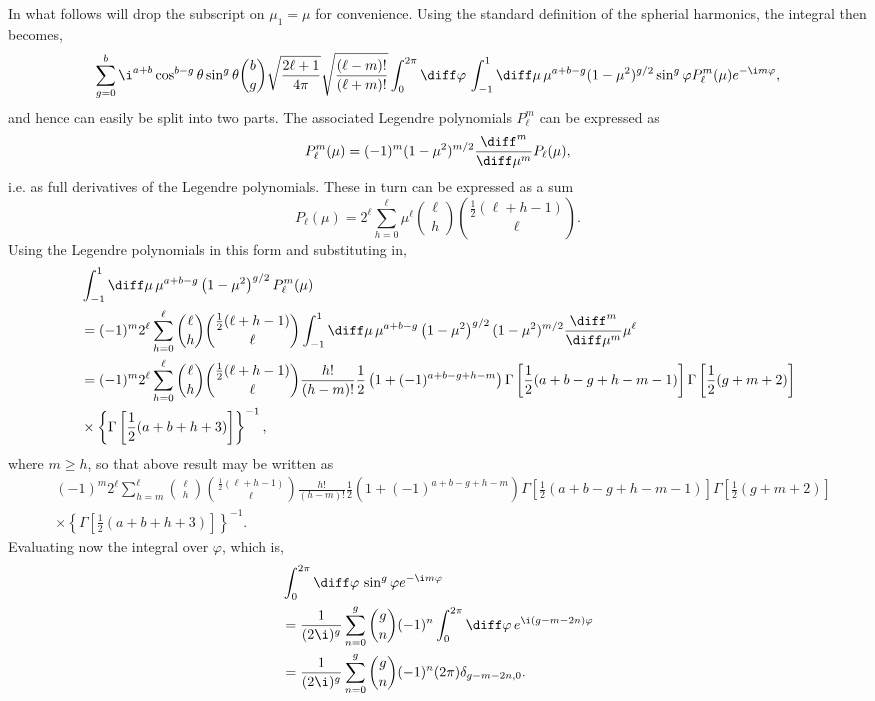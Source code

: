 In what follows will drop the subscript on \(\mu_1 = \mu\) for convenience. Using the standard definition of the spherial harmonics, the integral then becomes,
\begin{equation}
	\sum_{g=0}^b \i^{a+b} \cos^{b-g}\theta \sin^g\theta \binom{b}{g} \sqrt{\frac{2\ell+1}{4 \pi}} \sqrt{\frac{(\ell-m)!}{(\ell+m)!}}\int_0^{2\pi}\diff\varphi\, \int_{-1}^1 \diff\mu\, \mu^{a+b-g} (1-\mu^2)^{g/2} \sin^g\varphi P_\ell^m(\mu) e^{-\i m \varphi},
\end{equation}
and hence can easily be split into two parts. The associated Legendre polynomials \(P_\ell^m\) can be expressed as 
\begin{equation}
P_\ell^m(\mu) = (-1)^m (1-\mu^2)^{m/2} \frac{\diff^m}{\diff\mu^m} P_\ell(\mu), 
\end{equation}
i.e. as full derivatives of the Legendre polynomials. These in turn can be expressed as a sum 
\begin{equation}
P_\ell(\mu) =2^\ell \sum_{h=0}^\ell \mu^\ell \binom{\ell}{h} \binom{\frac{1}{2}(\ell+h-1)}{\ell}.
\end{equation}
Using the Legendre polynomials in this form and substituting in,
\begin{align}
	&\int_{-1}^1 \diff\mu\, \mu^{a+b-g} \left(1-\mu^2\right)^{g/2} P_\ell^m(\mu) \nonumber \\
	&= (-1)^m 2^\ell \sum_{h=0}^\ell \binom{\ell}{h} \binom{\frac{1}{2}(\ell+h-1)}{\ell} \int_{-1}^1 \diff\mu\, \mu^{a+b-g} \left(1-\mu^2\right)^{g/2}  (1-\mu^2)^{m/2} \frac{\diff^m}{\diff\mu^m} \mu^\ell \nonumber \\
	&= (-1)^m 2^\ell \sum_{h=0}^\ell \binom{\ell}{h} \binom{\frac{1}{2}(\ell+h-1)}{\ell} \frac{h!}{(h-m)!} \frac{1}{2} \left(1+ (-1)^{a+b-g+h-m}\right) \Gamma\left[\frac{1}{2}(a+b-g+h-m-1)\right] \Gamma\left[\frac{1}{2} (g+m+2)\right] \nonumber \\
	&\times  \left\{ \Gamma\left[\frac{1}{2} (a+b+h+3)\right] \right\}^{-1},
\end{align}
where \(m \geq h\), so that above result may be written as
\begin{align}
	&(-1)^m 2^\ell \sum_{h=m}^\ell \binom{\ell}{h} \binom{\frac{1}{2}(\ell+h-1)}{\ell} \frac{h!}{(h-m)!} \frac{1}{2} \left(1+ (-1)^{a+b-g+h-m}\right) \Gamma\left[\frac{1}{2}(a+b-g+h-m-1)\right] \Gamma\left[\frac{1}{2} (g+m+2)\right] \nonumber \\
	&\times  \left\{ \Gamma\left[\frac{1}{2} (a+b+h+3)\right] \right\}^{-1}.
\end{align}
Evaluating now the integral over \(\varphi\), which is, 
\begin{align}
	&\int_0^{2\pi} \diff\varphi\, \sin^g \varphi e^{-\i m \varphi} \nonumber \\
	& = \frac{1}{(2 \i)^g} \sum_{n=0}^g \binom{g}{n} (-1)^n \int_0^{2\pi}\diff\varphi\,  e^{\i (g-m-2n )\varphi} \nonumber \\
	&= \frac{1}{(2 \i)^g}  \sum_{n=0}^g \binom{g}{n} (-1)^n (2 \pi) \delta_{g-m-2n, 0}.
\end{align}


